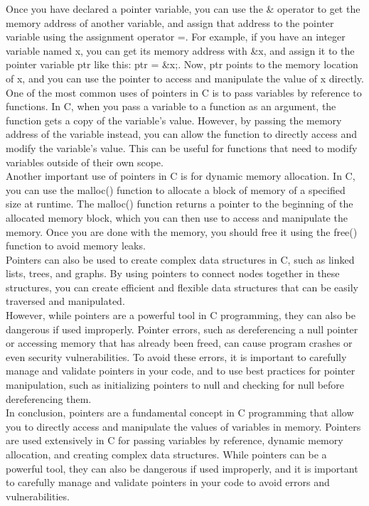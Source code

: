 \documentclass[12pt, letterpaper]{report}
\begin{document}
Once you have declared a pointer variable, you can use the \& operator to get 
the memory address of another variable, and assign that address to the pointer
variable using the assignment operator =. For example, if you have an integer 
variable named x, you can get its memory address with \&x, and assign it to the 
pointer variable ptr like this: ptr = \&x;. Now, ptr points to the memory 
location of x, and you can use the pointer to access and manipulate the value 
of x directly.\\

One of the most common uses of pointers in C is to pass variables by 
reference to functions. In C, when you pass a variable to a function as an 
argument, the function gets a copy of the variable's value. However, by 
passing the memory address of the variable instead, you can allow the function 
to directly access and modify the variable's value. This can be useful for 
functions that need to modify variables outside of their own scope.\\

Another important use of pointers in C is for dynamic memory allocation. In C,
you can use the malloc() function to allocate a block of memory of a specified 
size at runtime. The malloc() function returns a pointer to the beginning of 
the allocated memory block, which you can then use to access and manipulate 
the memory. Once you are done with the memory, you should free it using the 
free() function to avoid memory leaks.\\

Pointers can also be used to create complex data structures in C, such as 
linked lists, trees, and graphs. By using pointers to connect nodes together 
in these structures, you can create efficient and flexible data structures 
that can be easily traversed and manipulated.\\

However, while pointers are a powerful tool in C programming, they can also be
dangerous if used improperly. Pointer errors, such as dereferencing a null 
pointer or accessing memory that has already been freed, can cause program 
crashes or even security vulnerabilities. To avoid these errors, it is 
important to carefully manage and validate pointers in your code, and to use 
best practices for pointer manipulation, such as initializing pointers to null
and checking for null before dereferencing them.\\

In conclusion, pointers are a fundamental concept in C programming that allow 
you to directly access and manipulate the values of variables in memory. 
Pointers are used extensively in C for passing variables by reference, 
dynamic memory allocation, and creating complex data structures. While 
pointers can be a powerful tool, they can also be dangerous if used improperly,
and it is important to carefully manage and validate pointers in your code to 
avoid errors and vulnerabilities.\\
\end{document}
